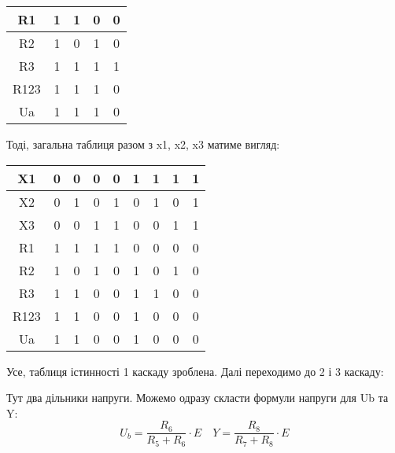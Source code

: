 \documentclass[a4paper,14pt]{extreport}
\begin{document}
\begin{table}[h]
  \begin{center}
    \begin{tabular}{|c|c|c|c|c|}
    \hline
    R1   & 1 & 1 & 0 & 0 \\ \hline
    R2   & 1 & 0 & 1 & 0 \\ \hline
    R3   & 1 & 1 & 1 & 1 \\ \hline
    R123 & 1 & 1 & 1 & 0 \\ \hline
    Ua   & 1 & 1 & 1 & 0 \\ \hline
    \end{tabular}
  \end{center}
\end{table}



Тоді, загальна таблиця разом з x1, x2, x3 матиме вигляд:


\begin{table}[h]
  \begin{center}
    \begin{tabular}{|c|c|c|c|c|c|c|c|c|}
    \hline
    X1   & 0 & 0 & 0 & 0 & 1 & 1 & 1 & 1 \\ \hline
    X2   & 0 & 1 & 0 & 1 & 0 & 1 & 0 & 1 \\ \hline
    X3   & 0 & 0 & 1 & 1 & 0 & 0 & 1 & 1 \\ \hline
    R1   & 1 & 1 & 1 & 1 & 0 & 0 & 0 & 0 \\ \hline
    R2   & 1 & 0 & 1 & 0 & 1 & 0 & 1 & 0 \\ \hline
    R3   & 1 & 1 & 0 & 0 & 1 & 1 & 0 & 0 \\ \hline
    R123 & 1 & 1 & 0 & 0 & 1 & 0 & 0 & 0 \\ \hline
    Ua   & 1 & 1 & 0 & 0 & 1 & 0 & 0 & 0 \\ \hline
    \end{tabular}
  \end{center}
\end{table}


Усе, таблиця істинності 1 каскаду зроблена. Далі переходимо до 2 і 3 каскаду:




\begin{figure}[h!]
\label{ris5}
\end{figure}
Тут два дільники напруги. Можемо одразу скласти формули напруги для Ub та Y:
\begin{equation}
U_{b}=\frac{R_{6}}{R_{5}+R_{6}} \cdot E \quad Y=\frac{R_{8}}{R_{7}+R_{8}} \cdot E
\end{equation}
\end{document}
